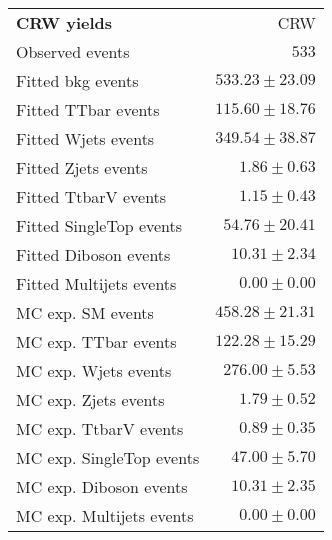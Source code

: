 

\begin{table}[h!]
\begin{center}
\setlength{\tabcolsep}{0.0pc}
{\small
\begin{tabular*}{\textwidth}{@{\extracolsep{\fill}}lr}
\noalign{\smallskip}\hline\noalign{\smallskip}
{\bf CRW yields}           & CRW                      \\[-0.05cm]
\noalign{\smallskip}\hline\noalign{\smallskip}
Observed events          & $533$                       \\
\noalign{\smallskip}\hline\noalign{\smallskip}
Fitted bkg events         & $533.23 \pm 23.09$                 \\
\noalign{\smallskip}\hline\noalign{\smallskip}
        Fitted TTbar events         & $115.60 \pm 18.76$                     \\
        Fitted Wjets events         & $349.54 \pm 38.87$                  \\
        Fitted Zjets events         & $1.86 \pm 0.63$                   \\
        Fitted TtbarV events         & $1.15 \pm 0.43$                     \\
        Fitted SingleTop events         & $54.76 \pm 20.41$                     \\
        Fitted Diboson events         & $10.31 \pm 2.34$                    \\
        Fitted Multijets events         & $0.00 \pm 0.00$                 \\
 \noalign{\smallskip}\hline\noalign{\smallskip}
MC exp. SM events              & $458.28 \pm 21.31$                     \\
\noalign{\smallskip}\hline\noalign{\smallskip}
        MC exp. TTbar events         & $122.28 \pm 15.29$                   \\
        MC exp. Wjets events         & $276.00 \pm 5.53$             \\
        MC exp. Zjets events         & $1.79 \pm 0.52$                     \\
        MC exp. TtbarV events         & $0.89 \pm 0.35$                      \\
        MC exp. SingleTop events         & $47.00 \pm 5.70$                   \\
        MC exp. Diboson events         & $10.31 \pm 2.35$                   \\
        MC exp. Multijets events         & $0.00 \pm 0.00$                \\

\end{tabular*}}
\end{center}
\end{table}

